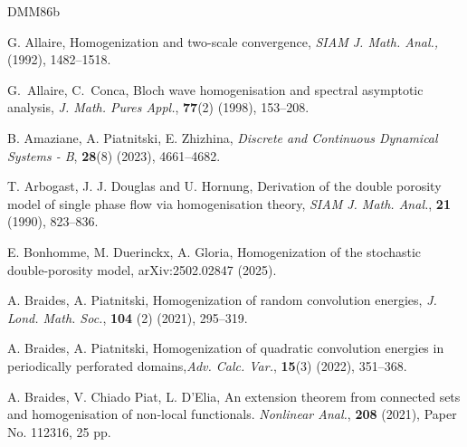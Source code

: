 \documentclass[11pt]{article}
\theoremstyle{remark}
\begin{document}
\begin{thebibliography}{DMM86b}
	
	
	

	
	G. Allaire,
	\newblock  Homogenization and two-scale convergence, {\it SIAM J. Math. Anal.,}
	(1992), 1482--1518.
	
	  G.~Allaire, C.~Conca, Bloch wave homogenisation and spectral asymptotic analysis,
	{\it J. Math. Pures Appl.}, {\bf 77}(2) (1998),  153--208.
	



		 B. Amaziane, A. Piatnitski, E. Zhizhina,
		 {\it Discrete and Continuous Dynamical Systems - B},  {\bf 28}(8) (2023), 4661--4682.
		
T. Arbogast, J. J. Douglas and U. Hornung, Derivation of the double porosity model of single
phase flow via homogenisation theory, {\it SIAM J. Math. Anal.}, {\bf 21} (1990), 823--836.
	

E. Bonhomme, M. Duerinckx, A. Gloria,
Homogenization of the stochastic double-porosity model, arXiv:2502.02847 (2025).

A. Braides, A. Piatnitski,
Homogenization of random convolution energies, {\it J. Lond. Math. Soc.}, {\bf 104} (2) (2021),  295--319.


A. Braides, A. Piatnitski,
Homogenization of quadratic convolution energies in periodically perforated domains,{\it  Adv. Calc. Var.}, {\bf 15}(3) (2022),  351--368.

A. Braides, V.  Chiado Piat, L. D'Elia,  An extension theorem from connected sets and homogenisation of non-local functionals. {\it Nonlinear Anal.}, {\bf 208} (2021), Paper No. 112316, 25 pp.



\end{thebibliography}
\end{document}
